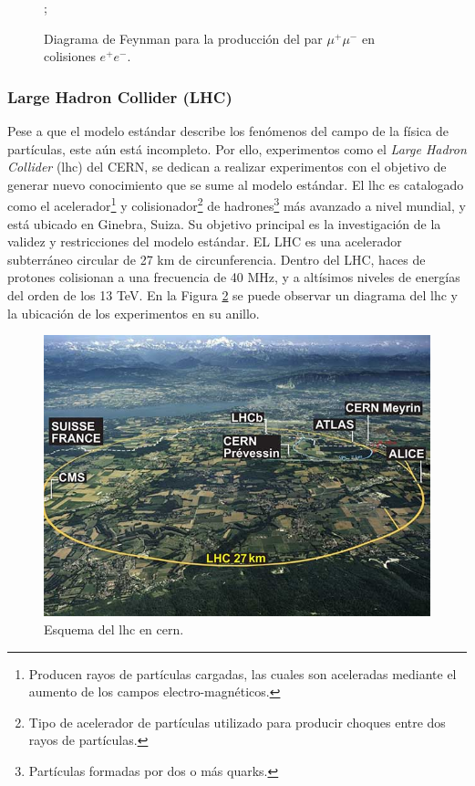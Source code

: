\begin{figure}[]
    \centering
    ;
    \caption[Diagrama de Feynman para la producción del par $\mu^+\mu^-$.]{Diagrama de Feynman para la producción del par $\mu^+\mu^-$ en colisiones $e^+ e^-$.
    }
    \label{fig:feynman1}
\end{figure}

\subsubsection{Large Hadron Collider (LHC)}
Pese a que el modelo estándar describe los fenómenos del campo de la física de partículas, este aún está incompleto. Por ello, experimentos como el \emph{Large Hadron Collider} (\acrshort{lhc}) del CERN, se dedican a realizar experimentos con el objetivo de generar nuevo conocimiento que se sume al modelo estándar.
%
El \acrshort{lhc} es catalogado como el acelerador\footnote{Producen rayos de partículas cargadas, las cuales son aceleradas mediante el aumento de los campos electro-magnéticos.} 
%
y colisionador\footnote{Tipo de acelerador de partículas utilizado para producir choques entre dos rayos de partículas.} 
%
de hadrones\footnote{Partículas formadas por dos o más quarks.} 
%
más avanzado a nivel mundial, y está ubicado en Ginebra, Suiza.
%
Su objetivo principal es la investigación de la validez y restricciones del modelo estándar. 
%
EL LHC es una acelerador subterráneo circular de 27 km de circunferencia.
%
Dentro del LHC, haces de protones colisionan a una frecuencia de 40 MHz, y a altísimos niveles de energías del orden de los 13 TeV.
%
En la Figura \ref{fig:lhc} se puede observar un diagrama del \acrshort{lhc} y la ubicación de los experimentos en su anillo.

\begin{figure}[h]
  \centering
  \includegraphics[width=12cm]{figures/image1.jpg}
  \caption[Esquema del LHC.]{Esquema del \acrshort{lhc} en \acrshort{cern}.
  }
  \label{fig:lhc}
\end{figure}

